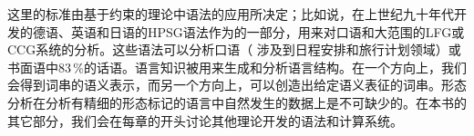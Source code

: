 这里的标准由基于约束的理论中语法的应用所决定；比如说，在上世纪九十年代开发的德语、英语和日语的HPSG语法作为\verbmobil \citep{Wahlster2000a-ed-not-crossreferenced}的一部分，用来对口语和大范围的LFG\indexlfgc 或CCG系统\indexccgc 的分析。这些语法可以分析口语（\verbmobil
涉及到日程安排和旅行计划领域）或书面语中83\,\%的话语。语言知识被用来生成和分析语言结构。在一个方向上，我们会得到词串的语义表示，而另一个方向上，可以创造出给定语义表征的词串。形态分析在分析有精细的形态标记的语言中自然发生的数据上是不可缺少的。在本书的其它部分，我们会在每章的开头讨论其他理论开发的语法和计算系统。

